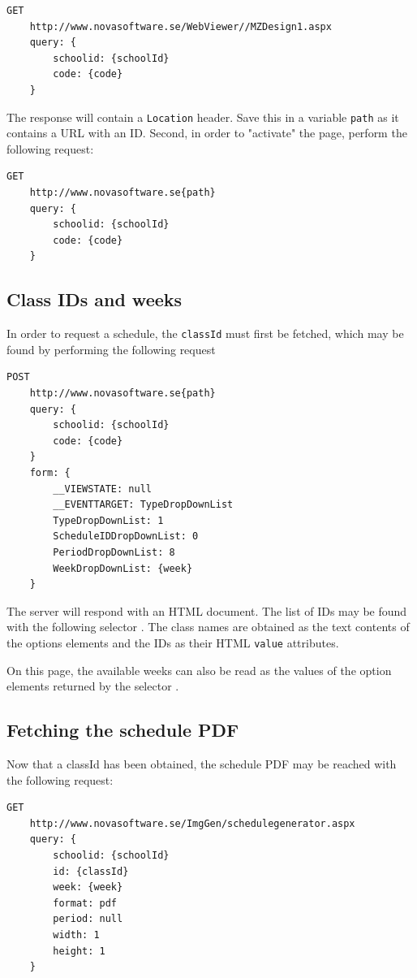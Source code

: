 \documentclass{article}
\begin{document}
	\begin{lstlisting}[language=HTTP, style=nonumbers]
	GET
	http://www.novasoftware.se/WebViewer//MZDesign1.aspx
	query: {
		schoolid: {schoolId}
		code: {code}
	}
	\end{lstlisting}
	
	The response will contain a \texttt{Location} header. Save this in a variable \texttt{path} as it contains a URL with an ID. Second, in order to "activate" the page, perform the following request:
	
	\newpage
	\begin{lstlisting}[language=HTTP, style=nonumbers]
	GET
	http://www.novasoftware.se{path}
	query: {
		schoolid: {schoolId}
		code: {code}
	}
	\end{lstlisting}
	
	\subsection{Class IDs and weeks}
	In order to request a schedule, the \texttt{classId} must first be fetched, which may be found by performing the following request
	
	\begin{lstlisting}[language=HTTP, style=nonumbers]
	POST
	http://www.novasoftware.se{path}
	query: {
		schoolid: {schoolId}
		code: {code}
	}
	form: {
		__VIEWSTATE: null
		__EVENTTARGET: TypeDropDownList
		TypeDropDownList: 1
		ScheduleIDDropDownList: 0
		PeriodDropDownList: 8
		WeekDropDownList: {week}
	}
	\end{lstlisting}
	
	The server will respond with an HTML document. The list of IDs may be found with the following selector . The class names are obtained as the text contents of the options elements and the IDs as their HTML \texttt{value} attributes.
	
	On this page, the available weeks can also be read as the values of the option elements returned by the selector .
	
	\subsection{Fetching the schedule PDF}
	Now that a classId has been obtained, the schedule PDF may be reached with the following request:
	
	\begin{lstlisting}[language=HTTP, style=nonumbers]
	GET
	http://www.novasoftware.se/ImgGen/schedulegenerator.aspx
	query: {
		schoolid: {schoolId}
		id: {classId}
		week: {week}
		format: pdf
		period: null
		width: 1
		height: 1
	}
	\end{lstlisting}
	
\end{document}
